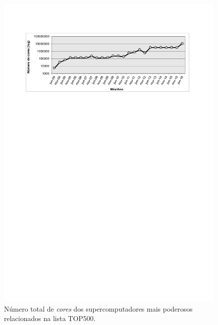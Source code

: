 \documentclass{SBCbookchapter}
\begin{document}
		\begin{figure}[t]
			\centering
			\includegraphics[width=13cm, height=!]{img/cores-top500.pdf}
			\caption{Número total de \textit{cores} dos supercomputadores
			mais poderosos relacionados na lista TOP500.}
			\label{fig:top500}
		\end{figure}
            
\end{document}
